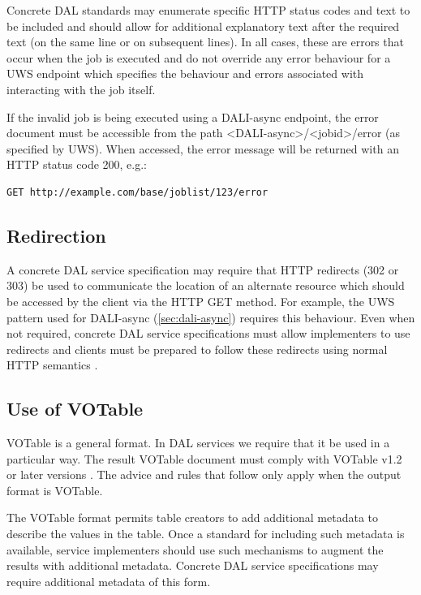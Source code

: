 \documentclass[11pt,letter]{ivoa}
\begin{document}
Concrete DAL standards may enumerate specific HTTP status codes and text to be included
and should allow for additional explanatory text after the required text (on the same line or
on subsequent lines). In all cases, these are errors that occur when the job is executed and
do not override any error behaviour for a UWS endpoint which specifies the behaviour and errors
associated with interacting with the job itself.

If the invalid job is being executed using a DALI-async endpoint, the error
document must be accessible from the path <DALI-async>/<jobid>/error
(as specified by UWS).  When accessed, the error message will be returned with
an HTTP status code 200, e.g.:

\begin{verbatim}
GET http://example.com/base/joblist/123/error
\end{verbatim}

\subsection{Redirection}
\label{sec:redirects}
A concrete DAL service specification may require that HTTP redirects (302 or
303) be used to communicate the location of an alternate resource which should
be accessed by the client via the HTTP GET method. For example, the UWS pattern
used for DALI-async (\ref{sec:dali-async}) requires this behaviour. Even when not
required, concrete DAL service specifications must allow implementers to use
redirects and clients must be prepared to follow these redirects using normal
HTTP semantics \citep{std:HTTP}.

\subsection{Use of VOTable}
\label{sec:use-votable}
VOTable is a general format. In DAL services we require that it be used in a
particular way. The result VOTable document must comply with VOTable
v1.2 or later versions
\citep{2019ivoa.spec.1021O}. The advice and rules that follow only apply
when the output format is VOTable.

The VOTable format permits table creators to add additional metadata to describe
the values in the table. Once a standard for including such metadata is
available, service implementers should use such mechanisms to augment the
results with additional metadata. Concrete DAL service specifications may
require additional metadata of this form.
\end{document}
